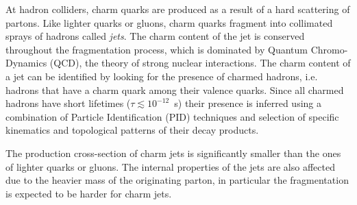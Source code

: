 \documentclass[12pt, a4paper, twoside, titlepage]{article}
\begin{document}
At hadron colliders, charm quarks are produced as a result of a hard scattering of partons. Like lighter quarks or gluons, charm quarks
fragment into collimated sprays of hadrons called \emph{jets}. The charm content of the jet is conserved throughout the fragmentation process,
which is dominated by Quantum Chromo-Dynamics (QCD), the theory of strong nuclear interactions.
The charm content of a jet can be identified by looking for the presence of charmed hadrons, i.e. hadrons that have
a charm quark among their valence quarks. Since all charmed hadrons have short lifetimes ($\tau \lesssim 10^{-12}$~s) their presence is inferred
using a combination of Particle Identification (PID) techniques and selection of specific kinematics and topological patterns of their decay products.

The production cross-section of charm jets is significantly smaller than the ones of lighter quarks or gluons. The internal
properties of the jets are also affected due to the heavier mass of the originating parton, 
in particular the fragmentation is expected to be harder for charm jets.
\end{document}
